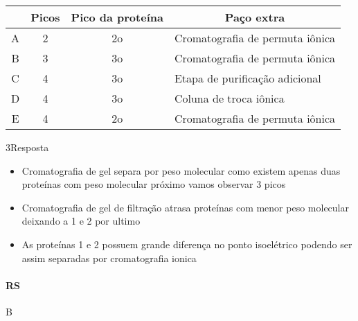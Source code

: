 \documentclass[\mainfilename]{subfiles}
\begin{document}
\begin{questionBox}
    
    \begin{center}

        \setlength\tabcolsep{2mm}        %
        \renewcommand\arraystretch{1.25} %

        \begin{tabular}{c c c l}
            
            \\\toprule
            
               &\multicolumn{1}{c}{Picos}
               &\multicolumn{1}{c}{Pico da proteína}
               &\multicolumn{1}{c}{Paço extra}
            
            \\\midrule
            
                A & 2 & 2o 
                & Cromatografia de permuta iônica
                \\
                B & 3 & 3o 
                & Cromatografia de permuta iônica
                \\
                C & 4 & 3o 
                & Etapa de purificação adicional
                \\
                D & 4 & 3o 
                & Coluna de troca iônica
                \\
                E & 4 & 2o
                & Cromatografia de permuta iônica
            
            \\\bottomrule
            
        \end{tabular}
    \end{center}

    \begin{questionBox}3{Resposta}
        
        \begin{itemize}
            \item Cromatografia de gel separa por peso molecular como existem apenas duas proteínas com peso molecular próximo vamos observar 3 picos
            \item Cromatografia de gel de filtração atrasa proteínas com menor peso molecular deixando a 1 e 2 por ultimo
            \item As proteínas 1 e 2 possuem grande diferença no ponto isoelétrico podendo ser assim separadas por cromatografia ionica
        \end{itemize}

        \paragraph{RS} B
        
    \end{questionBox}

\end{questionBox}
\end{document}
